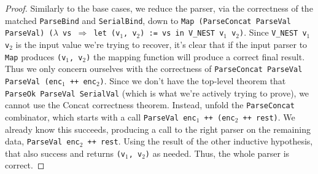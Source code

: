 \begin{proof}
  Similarly to the base cases, we reduce the parser, via the correctness of the
  matched \texttt{ParseBind} and \texttt{SerialBind}, down to \texttt{Map
    (ParseConcat ParseVal ParseVal) ($\lambda$ vs $\Rightarrow$ let (v$_1$, v$_2$) := vs in
    V\_NEST v$_1$ v$_2$)}. Since \texttt{V\_NEST v$_1$ v$_2$} is the input value
  we're trying to recover, it's clear that if the input parser to \texttt{Map}
  produces \texttt{(v$_1$, v$_2$)} the mapping function will produce a correct
  final result. Thus we only concern ourselves with the correctness of
  \texttt{ParseConcat ParseVal ParseVal (enc$_1$ ++ enc$_2$)}. Since we don't
  have the top-level theorem that \texttt{ParseOk ParseVal SerialVal} (which is
  what we're actively trying to prove), we cannot use the Concat correctness
  theorem. Instead, unfold the \texttt{ParseConcat} combinator, which starts
  with a call \texttt{ParseVal enc$_1$ ++ (enc$_2$ ++ rest)}. We already know
  this succeeds, producing a call to the right parser on the remaining data,
  \texttt{ParseVal enc$_2$ ++ rest}. Using the result of the other inductive
  hypothesis, that also success and returns \texttt{(v$_1$, v$_2$)} as
  needed. Thus, the whole parser is correct.
\end{proof}

